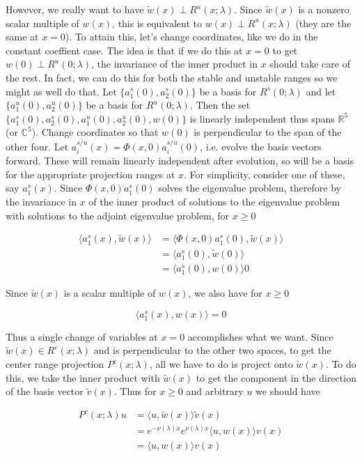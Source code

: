 \documentclass[12pt]{article}
\def\R{{\mathbb R}}
\def\C{{\mathbb C}}
\begin{document}
However, we really want to have $\tilde{w}(x) \perp R^u(x; \lambda)$. Since $\tilde{w}(x)$ is a nonzero scalar multiple of $w(x)$, this is equivalent to $w(x) \perp R^u(x; \lambda)$ (they are the same at $x = 0$). To attain this, let's change coordinates, like we do in the constant coeffient case. The idea is that if we do this at $x = 0$ to get $w(0) \perp R^u(0; \lambda)$, the invariance of the inner product in $x$ should take care of the rest. In fact, we can do this for both the stable and unstable ranges so we might as well do that. Let $\{ a^s_1(0), a^s_2(0)\}$ be a basis for $R^s(0; \lambda)$ and let $\{a^u_1(0), a^u_2(0)\}$ be a basis for $R^u(0; \lambda)$. Then the set $\{ a^s_1(0), a^s_2(0),a^u_1(0), a^u_2(0), w(0) \}$ is linearly independent thus spans $\R^5$ (or $\C^5$). Change coordinates so that $w(0)$ is perpendicular to the span of the other four. Let $a^{s/u}_i(x) = \Phi(x,0)a^{s/u}_i(0)$, i.e. evolve the basis vectors forward. These will remain linearly independent after evolution, so will be a basis for the appropriate projection ranges at $x$. For simplicity, consider one of these, say $a^s_1(x)$. Since $\Phi(x,0) a^s_1(0)$ solves the eigenvalue problem, therefore by the invariance in $x$ of the inner product of solutions to the eigenvalue problem with solutions to the adjoint eigenvalue problem, for $x \geq 0$

\begin{align*}
\langle a^s_1(x), \tilde{w}(x) \rangle &= \langle \Phi(x,0) a^s_1(0), \tilde{w}(x) \rangle \\
&= \langle a^s_1(0), \tilde{w}(0) \rangle \\
&= \langle a^s_1(0), w(0) \rangle 0
\end{align*}

Since $\tilde{w}(x)$ is a scalar multiple of $w(x)$, we also have for $x \geq 0$

\[
\langle a^s_1(x), w(x) \rangle = 0
\]

Thus a single change of variables at $x = 0$ accomplishes what we want. Since $\tilde{w}(x) \in R^c(x; \lambda)$ and is perpendicular to the other two spaces, to get the center range projection $P^c(x; \lambda)$, all we have to do is project onto $\tilde{w}(x)$. To do this, we take the inner product with $\tilde{w}(x)$ to get the component in the direction of the basis vector $\tilde{v}(x)$. Thus for $x \geq 0$ and arbitrary $u$ we should have

\begin{align*}
P^c(x; \lambda)u &= \langle u, \tilde{w}(x) \rangle \tilde{v}(x) \\
&= e^{-\nu(\lambda)x} e^{\nu(\lambda) x }\langle u, w(x) \rangle v(x) \\
&= \langle u, w(x) \rangle v(x)
\end{align*}
\end{document}
